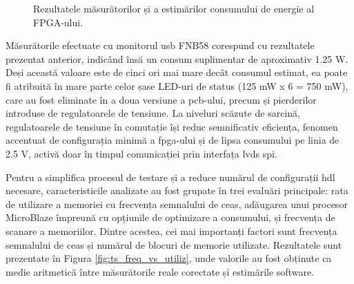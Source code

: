 \documentclass[12pt,a4paper]{report}
\begin{document}
\begin{figure}[h]
    \centering
    \caption{Rezultatele măsurătorilor și a estimărilor consumului de energie al FPGA-ului.}%
\label{fig:ts_consumption_calibration}
\end{figure}

Măsurătorile efectuate cu monitorul \gls{usb} FNB58 corespund cu rezultatele prezentat anterior, indicând însă un consum suplimentar de aproximativ 1.25 W. Deși această valoare este de cinci ori mai mare decât consumul estimat, ea poate fi atribuită în mare parte celor șase LED-uri de status (125 mW x 6 = 750 mW), care au fost eliminate în a doua versiune a \gls{pcb}-ului, precum și pierderilor introduse de regulatoarele de tensiune. La niveluri scăzute de sarcină, regulatoarele de tensiune în comutație își reduc semnificativ eficiența, fenomen accentuat de configurația minimă a \gls{fpga}-ului și de lipsa consumului pe linia de 2.5 V, activă doar în timpul comunicației prin interfața \gls{lvds} \gls{spi}.

Pentru a simplifica procesul de testare și a reduce numărul de configurații \gls{hdl} necesare, caracteristicile analizate au fost grupate în trei evaluări principale: rata de utilizare a memoriei cu frecvența semnalului de ceas, adăugarea unui procesor MicroBlaze împreună cu opțiunile de optimizare a consumului, și frecvența de scanare a memoriilor. Dintre acestea, cei mai importanți factori sunt frecvența semnalului de ceas și numărul de blocuri de memorie utilizate. Rezultatele sunt prezentate în Figura \ref{fig:ts_freq_vs_utiliz}, unde valorile au fost obținute ca medie aritmetică între măsurătorile reale corectate și estimările software.
\end{document}
